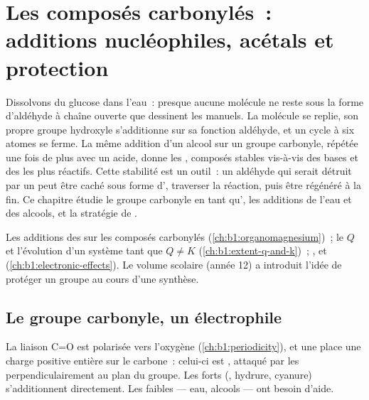 \chapter{Les composés carbonylés~: additions nucléophiles, acétals et protection}\label{ch:b1:acetals-protection}

Dissolvons du glucose dans l'eau~: presque aucune molécule ne reste sous
la forme d'aldéhyde à chaîne ouverte que dessinent les manuels. La
molécule se replie, son propre groupe hydroxyle s'additionne sur sa
fonction aldéhyde, et un cycle à six atomes se ferme. La même addition
d'un alcool sur un groupe carbonyle, répétée une fois de plus avec un
 acide, donne les , composés stables vis-à-vis des bases
et des  les plus réactifs. Cette stabilité est un outil~: un
aldéhyde qui serait détruit par un  peut être caché sous
forme d', traverser la réaction, puis être régénéré à la fin. Ce
chapitre étudie le groupe carbonyle en tant qu', les
additions de l'eau et des alcools, et la stratégie de .

\begin{recall}
Les additions des  sur les composés carbonylés
(\cref{ch:b1:organomagnesium})~; le  $Q$ et
l'évolution d'un système tant que $Q \neq K$
(\cref{ch:b1:extent-q-and-k})~; ,  et
 (\cref{ch:b1:electronic-effects}). Le volume scolaire
(année 12) a introduit l'idée de protéger un groupe au cours d'une
synthèse.
\end{recall}

\section{Le groupe carbonyle, un électrophile}

La liaison C=O est polarisée vers l'oxygène (\cref{ch:b1:periodicity}),
et une   place une charge positive entière sur
le carbone~: celui-ci est , attaqué par les 
perpendiculairement au plan du groupe. Les  forts
(, hydrure, cyanure) s'additionnent directement. Les
 faibles --- eau, alcools --- ont besoin d'aide.

